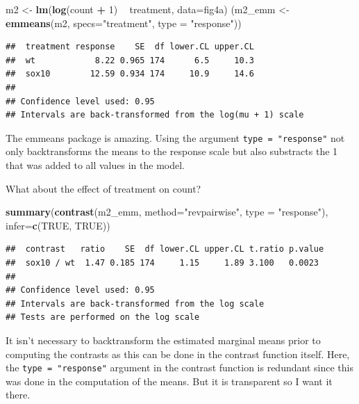 \documentclass[]{book}
\newenvironment{Shaded}{\begin{snugshade}}{\end{snugshade}}
\newcommand{\KeywordTok}[1]{\textcolor[rgb]{0.13,0.29,0.53}{\textbf{#1}}}
\newcommand{\DataTypeTok}[1]{\textcolor[rgb]{0.13,0.29,0.53}{#1}}
\newcommand{\DecValTok}[1]{\textcolor[rgb]{0.00,0.00,0.81}{#1}}
\newcommand{\StringTok}[1]{\textcolor[rgb]{0.31,0.60,0.02}{#1}}
\newcommand{\OtherTok}[1]{\textcolor[rgb]{0.56,0.35,0.01}{#1}}
\newcommand{\OperatorTok}[1]{\textcolor[rgb]{0.81,0.36,0.00}{\textbf{#1}}}
\newcommand{\NormalTok}[1]{#1}
\begin{document}
\begin{Shaded}
\begin{Highlighting}[]
\NormalTok{m2 <-}\StringTok{ }\KeywordTok{lm}\NormalTok{(}\KeywordTok{log}\NormalTok{(count }\OperatorTok{+}\StringTok{ }\DecValTok{1}\NormalTok{) }\OperatorTok{~}\StringTok{ }\NormalTok{treatment, }\DataTypeTok{data=}\NormalTok{fig4a)}
\NormalTok{(m2_emm <-}\StringTok{ }\KeywordTok{emmeans}\NormalTok{(m2,}
                  \DataTypeTok{specs=}\StringTok{"treatment"}\NormalTok{,}
                  \DataTypeTok{type =} \StringTok{"response"}\NormalTok{))}
\end{Highlighting}
\end{Shaded}

\begin{verbatim}
##  treatment response    SE  df lower.CL upper.CL
##  wt            8.22 0.965 174      6.5     10.3
##  sox10        12.59 0.934 174     10.9     14.6
## 
## Confidence level used: 0.95 
## Intervals are back-transformed from the log(mu + 1) scale
\end{verbatim}

The emmeans package is amazing. Using the argument
\texttt{type\ =\ "response"} not only backtransforms the means to the
response scale but also substracts the 1 that was added to all values in
the model.

What about the effect of treatment on count?

\begin{Shaded}
\begin{Highlighting}[]
\KeywordTok{summary}\NormalTok{(}\KeywordTok{contrast}\NormalTok{(m2_emm, }
                 \DataTypeTok{method=}\StringTok{"revpairwise"}\NormalTok{,}
                 \DataTypeTok{type =} \StringTok{"response"}\NormalTok{),}
        \DataTypeTok{infer=}\KeywordTok{c}\NormalTok{(}\OtherTok{TRUE}\NormalTok{, }\OtherTok{TRUE}\NormalTok{))}
\end{Highlighting}
\end{Shaded}

\begin{verbatim}
##  contrast   ratio    SE  df lower.CL upper.CL t.ratio p.value
##  sox10 / wt  1.47 0.185 174     1.15     1.89 3.100   0.0023 
## 
## Confidence level used: 0.95 
## Intervals are back-transformed from the log scale 
## Tests are performed on the log scale
\end{verbatim}

It isn't necessary to backtransform the estimated marginal means prior
to computing the contrasts as this can be done in the contrast function
itself. Here, the \texttt{type\ =\ "response"} argument in the contrast
function is redundant since this was done in the computation of the
means. But it is transparent so I want it there.
\end{document}
